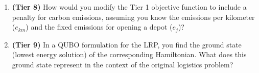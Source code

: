 \documentclass{article}
\begin{document}
\begin{enumerate}
    \item \textbf{(Tier 8)} How would you modify the Tier 1 objective function to include a penalty for carbon emissions, assuming you know the emissions per kilometer ($e_{km}$) and the fixed emissions for opening a depot ($e_j$)?

    \item \textbf{(Tier 9)} In a QUBO formulation for the LRP, you find the ground state (lowest energy solution) of the corresponding Hamiltonian. What does this ground state represent in the context of the original logistics problem?

\end{enumerate}
\end{document}
